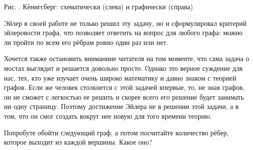 \begin{center}\small Рис. \images. Кёнигсберг: схематически (слева) и графически (справа)\end{center}

	Эйлер в своей работе не только решил эту задачу, но и сформулировал критерий эйлеровости графа, что позволяет ответить на вопрос для 
	любого графа: можно ли пройти по всем его рёбрам ровно один раз или нет. 
	
	Хочется также остановить вниманиие читателя на том моменте, что сама задача о мостах выглядит и решается довольно просто. Однако
	это верное суждение для нас, тех, кто уже изучает очень широко математику и давно знаком с теорией графов. Если же человек столкнется с
	этой задачей впервые, то, не зная графов, он не сможет с легкостью ее решить и скорее всего его решение будет занимать ни одну страницу.
	Поэтому достижение Эйлера не в решении этой задачи, а в том, что он смог создать вокруг нее новую для того времени теорию.	
	
\begin{testquestion}
	Попробуте обойти следующий граф, а потом посчитайте количество рёбер, которое выходит из каждой вершины. Какое оно?
\end{testquestion}

\begin{center}\end{center}

